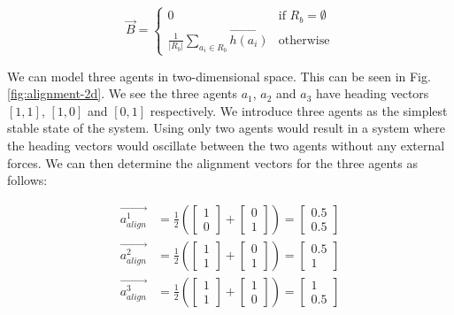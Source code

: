 \documentclass[12pt]{article}
\begin{document}
\begin{equation}
\vec{B} =
\begin{cases}
    0 & \text{if } R_b = \emptyset \\
    \frac{1}{|R_b|} \sum_{a_i \in R_b} \vec{h(a_i)} & \text{otherwise}
\end{cases}
\end{equation}

We can model three agents in two-dimensional space. This can be seen in Fig. \ref{fig:alignment-2d}. We see the three agents $a_1$, $a_2$ and $a_3$ have heading vectors $[1,1]$, $[1,0]$ and $[0,1]$ respectively. We introduce three agents as the simplest stable state of the system. Using only two agents would result in a system where the heading vectors would oscillate between the two agents without any external forces. We can then determine the alignment vectors for the three agents as follows:

\begin{equation}
    \begin{aligned}
        \vec{a_{align}^1} &= \frac{1}{2} \left( \begin{bmatrix} 1 \\ 0 \end{bmatrix} + \begin{bmatrix} 0 \\ 1 \end{bmatrix} \right) = \begin{bmatrix} 0.5 \\ 0.5 \end{bmatrix} \\
        \vec{a_{align}^2} &= \frac{1}{2} \left( \begin{bmatrix} 1 \\ 1 \end{bmatrix} + \begin{bmatrix} 0 \\ 1 \end{bmatrix} \right) = \begin{bmatrix} 0.5 \\ 1 \end{bmatrix} \\
        \vec{a_{align}^3} &= \frac{1}{2} \left( \begin{bmatrix} 1 \\ 1 \end{bmatrix} + \begin{bmatrix} 1 \\ 0 \end{bmatrix} \right) = \begin{bmatrix} 1 \\ 0.5 \end{bmatrix}
    \end{aligned}
\end{equation}
\end{document}
